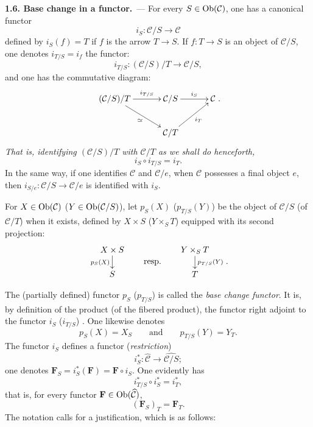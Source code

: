 \par{}
\noindent\textbf{1.6. Base change in a functor.}\ ---
For every \(S\in\operatorname{Ob}(\mathcal{C})\), one has a canonical functor
\[
i_{S}\colon\mathcal{C}/S\to\mathcal{C}
\]
defined by \(i_{S}(f)=T\) if \(f\) is the arrow \(T\to S\). If
\(f\colon T\to S\) is an object of \(\mathcal{C}/S\), one denotes
\(i_{T/S}=i_{f}\) the functor:
\[
i_{T/S}\colon(\mathcal{C}/S)/T\to\mathcal{C}/S,
\]
and one has the commutative diagram:
\[
\xymatrix@C=3.2em{
(\mathcal{C}/S)/T
  \ar[r]^-{i_{T/S}}
  \ar[rd]_-{\simeq}
&
\mathcal{C}/S
  \ar[r]^-{i_{S}}
&
\mathcal{C}
\\
&
\mathcal{C}/T
  \ar[ru]_-{i_{T}}
&
}.
\]
\emph{That is, identifying \((\mathcal{C}/S)/T\) with \(\mathcal{C}/T\) as
we shall do henceforth,}
\[
i_{S}\circ i_{T/S}=i_{T}.
\]
In the same way, if one identifies \(\mathcal{C}\) and \(\mathcal{C}/e\),
when \(\mathcal{C}\) possesses a final object \(e\), then
\(i_{S/e}\colon\mathcal{C}/S\to\mathcal{C}/e\) is identified with
\(i_{S}\).

For \(X\in\operatorname{Ob}(\mathcal{C})\) (\resp \(Y\in\operatorname{Ob}(\mathcal{C}/S)\)), let
\(p_{S}(X)\) (\resp \(p_{T/S}(Y)\)) be the object of \(\mathcal{C}/S\)
(\resp of \(\mathcal{C}/T\)) when it exists, defined by \(X\times S\)
(\resp \(Y\times_{S}T\)) equipped with its second projection:
\[
\vcenter{\xymatrix@R=1.5em{
X\times S\ar[d]_{p_{S}(X)}\\
S
}}
\qquad\text{resp.}\qquad
\vcenter{\xymatrix@R=1.5em{
Y\times_{S}T\ar[d]^{p_{T/S}(Y)}\\
T
}}.
\]

The (partially defined) functor \(p_{S}\) (\resp \(p_{T/S}\)) is called
the \emph{base change functor}. It is, by definition of the product
(\resp of the fibered product), the functor right adjoint to the functor
\(i_{S}\) (\resp \(i_{T/S}\))%
{\renewcommand{\thefootnote}{(12)}}%
.
One likewise denotes
\[
p_{S}(X)=X_{S}
\qquad\text{and}\qquad
p_{T/S}(Y)=Y_{T}.
\]
The functor \(i_{S}\) defines a functor (\emph{restriction})
\[
i_{S}^{*}\colon\widehat{\mathcal{C}}\to\widehat{\mathcal{C}/S};
\]
one denotes \(\mathbf{F}_{S}=i_{S}^{*}(\mathbf{F})=\mathbf{F}\circ i_{S}\).
One evidently has
\[
i_{T/S}^{*}\circ i_{S}^{*}=i_{T}^{*},
\]
that is, for every functor \(\mathbf{F}\in\operatorname{Ob}(\widehat{\mathcal{C}})\),
\[
(\mathbf{F}_{S})_{T}=\mathbf{F}_{T}.
\]
The notation calls for a justification, which is as follows:

